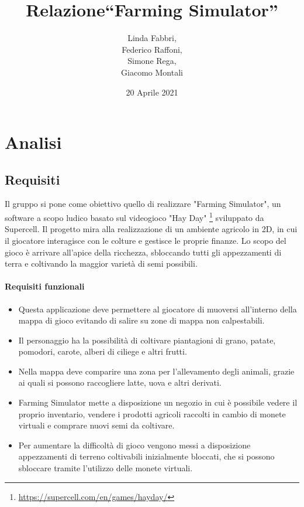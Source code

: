 \documentclass[a4paper,12pt]{report}
\title{Relazione\break``Farming Simulator''}
\author{Linda Fabbri, \\ Federico Raffoni,\\ Simone Rega,\\ Giacomo Montali}
\date{20 Aprile 2021}
\begin{document}
\maketitle

\tableofcontents

\chapter{Analisi}


\section{Requisiti}


Il gruppo si pone come obiettivo quello di realizzare "Farming Simulator", un software a scopo ludico basato sul videogioco "Hay Day" \footnote{\url{https://supercell.com/en/games/hayday/}} sviluppato da Supercell.
Il progetto mira alla realizzazione di un ambiente agricolo in 2D, in cui il giocatore interagisce con le colture e gestisce le proprie finanze.
Lo scopo del gioco è arrivare all'apice della ricchezza, sbloccando tutti gli appezzamenti di terra e coltivando la maggior varietà di semi possibili.


\subsubsection{Requisiti funzionali}
\begin{itemize}
	\item Questa applicazione deve permettere al giocatore di muoversi all'interno della mappa di gioco evitando di salire su zone di mappa non calpestabili.
	\item Il personaggio ha la possibilità di coltivare piantagioni di grano, patate, pomodori, carote, alberi di ciliege e altri frutti.
	\item Nella mappa deve comparire una zona per l'allevamento degli animali, grazie ai quali si possono raccogliere latte, uova e altri derivati.
	\item Farming Simulator mette a disposizione un negozio in cui è possibile vedere il proprio inventario, vendere i prodotti agricoli raccolti in cambio di monete virtuali e comprare nuovi semi da coltivare.
	\item Per aumentare la difficoltà di gioco vengono messi a disposizione appezzamenti di terreno coltivabili inizialmente bloccati, che si possono sbloccare tramite l'utilizzo delle monete virtuali.
\end{itemize}
\end{document}

